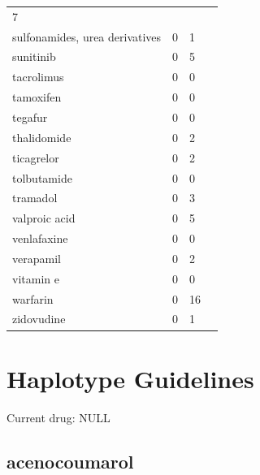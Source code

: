 \documentclass{book}
\begin{document}
\begin{tabularx}{1.3\textwidth}{XXXX}
7 \\sulfonamides, urea derivatives &  0 & 1 \\sunitinib &  0 & 5 \\tacrolimus &  0 & 0 \\tamoxifen &  0 & 0 \\tegafur &  0 & 0 \\thalidomide &  0 & 2 \\ticagrelor &  0 & 2 \\tolbutamide &  0 & 0 \\tramadol &  0 & 3 \\valproic acid &  0 & 5 \\venlafaxine &  0 & 0 \\verapamil &  0 & 2 \\vitamin e &  0 & 0 \\warfarin &  0 & 16 \\zidovudine &  0 & 1 \\\end{tabularx}

\normalsize

\newpage


\section{Haplotype Guidelines}

      

    

      Current drug: NULL

      \subsection{ acenocoumarol }
\end{document}

